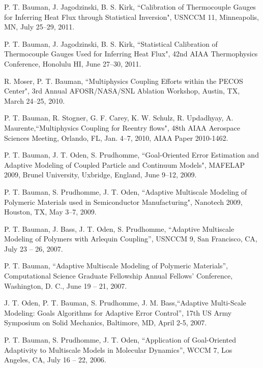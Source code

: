 \documentclass[12pt]{article}
\newcommand{\blankline}{\quad\pagebreak[2]}
\begin{document}
\blankline

P. T. Bauman,  J. Jagodzinski, B. S. Kirk, ``Calibration of Thermocouple Gauges for Inferring Heat Flux through Statistical Inversion", USNCCM 11,
Minneapolis, MN, July 25--29, 2011.

\blankline

P. T. Bauman, J. Jagodzinski, B. S. Kirk, ``Statistical Calibration of Thermocouple Gauges Used for Inferring Heat Flux", 42nd AIAA Thermophysics
Conference, Honolulu HI, June 27--30, 2011.

\blankline

R. Moser, P. T. Bauman, ``Multiphysics Coupling Efforts within the PECOS Center", 3rd Annual AFOSR/NASA/SNL Ablation Workshop, Austin, TX, March 24--25, 2010.

\blankline

P. T. Bauman, R. Stogner, G. F. Carey, K. W. Schulz, R. Updadhyay, A. Maurente,``Multiphysics Coupling for Reentry flows", 48th AIAA Aerospace Sciences Meeting, Orlando, FL,  Jan. 4--7, 2010, AIAA Paper 2010-1462.

\blankline

P. T. Bauman, J. T. Oden, S. Prudhomme, ``Goal-Oriented Error Estimation and Adaptive Modeling of Coupled Particle and Continuum Models", MAFELAP 2009, Brunel University, Uxbridge, England, June 9--12, 2009.

\blankline

P. T. Bauman, S. Prudhomme, J. T. Oden, ``Adaptive Multiscale Modeling of Polymeric Materials 
used in Semiconductor Manufacturing", Nanotech 2009, Houston, TX, May 3--7, 2009.

\blankline

P. T. Bauman, J. Bass, J. T. Oden, S. Prudhomme, ``Adaptive Multiscale Modeling of Polymers with Arlequin Coupling'', USNCCM 9, San Francisco, CA, July 23 -- 26, 2007.

\blankline

P. T. Bauman, ``Adaptive Multiscale Modeling of Polymeric Materials'', Computational Science Graduate Fellowship Annual Fellows' Conference, Washington, D. C., June 19 -- 21, 2007.

\blankline

J. T. Oden, P. T. Bauman, S. Prudhomme, J. M. Bass,``Adaptive Multi-Scale Modeling: Goals Algorithms for Adaptive Error Control'', 17th US Army Symposium on Solid Mechanics, Baltimore, MD, April 2-5, 2007.

\blankline

P. T. Bauman, S. Prudhomme, J. T. Oden, ``Application of Goal-Oriented Adaptivity to Multiscale Models in Molecular Dynamics'', WCCM 7, Los Angeles, CA, July 16 -- 22, 2006.
\end{document}
